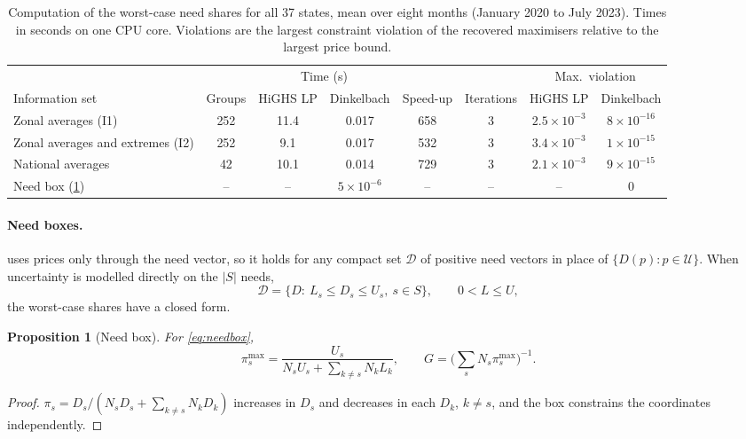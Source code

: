 \documentclass[preprint,12pt,number]{elsarticle}%
\newtheorem{proposition}{Proposition}
\theoremstyle{definition}
\theoremstyle{remark}
\newcommand{\U}{\mathcal{U}}
\newcommand{\pimax}{\pi^{\max}}
\begin{document}
\begin{table}[t]
\centering
\caption{Computation of the worst-case need shares for all 37 states, mean over eight months (January 2020 to July 2023). Times in seconds on one CPU core. Violations are the largest constraint violation of the recovered maximisers relative to the largest price bound.}\label{tab:computation}
\small
\begin{tabular}{lccccccc}
\toprule
 & & \multicolumn{2}{c}{Time (s)} & & & \multicolumn{2}{c}{Max.\ violation}\\
\cmidrule(lr){3-4}\cmidrule(lr){7-8}
Information set & Groups & HiGHS LP & Dinkelbach & Speed-up & Iterations & HiGHS LP & Dinkelbach\\
\midrule
Zonal averages (I1) & 252 & 11.4 & 0.017 & 658 & 3 & $2.5\times10^{-3}$ & $8\times10^{-16}$\\
Zonal averages and extremes (I2) & 252 & 9.1 & 0.017 & 532 & 3 & $3.4\times10^{-3}$ & $1\times10^{-15}$\\
National averages & 42 & 10.1 & 0.014 & 729 & 3 & $2.1\times10^{-3}$ & $9\times10^{-15}$\\
Need box (\cref{prop:needbox}) & -- & -- & $5\times10^{-6}$ & -- & -- & -- & 0\\
\bottomrule
\end{tabular}
\end{table}

\paragraph{Need boxes.}  uses prices only through the need vector, so it holds for any compact set $\mathcal D$ of positive need vectors in place of $\{D(p):p\in\U\}$. When uncertainty is modelled directly on the $|S|$ needs,
\begin{equation}\label{eq:needbox}
\mathcal D=\{D:\ L_s\le D_s\le U_s,\ s\in S\},\qquad 0<L\le U,
\end{equation}
the worst-case shares have a closed form.

\begin{proposition}[Need box]\label{prop:needbox}
For \eqref{eq:needbox},
\[
\pimax_s=\frac{U_s}{N_sU_s+\sum_{k\neq s}N_kL_k},\qquad G=\Big(\sum_sN_s\pimax_s\Big)^{-1}.
\]
\end{proposition}

\begin{proof}
$\pi_s=D_s/(N_sD_s+\sum_{k\ne s}N_kD_k)$ increases in $D_s$ and decreases in each $D_k$, $k\ne s$, and the box constrains the coordinates independently.
\end{proof}
\end{document}
